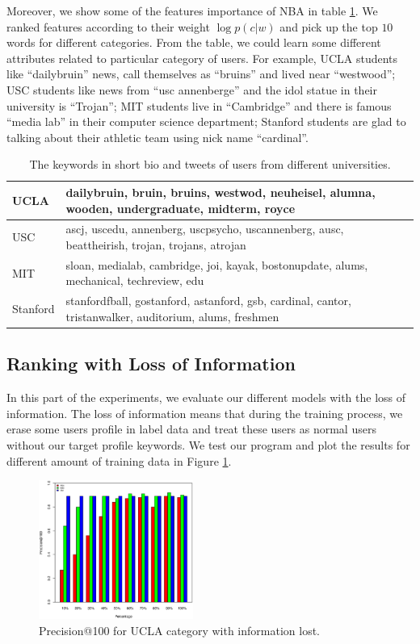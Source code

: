\documentclass{article}
\begin{document}
Moreover, we show some of the features importance of NBA in table \ref{tab:keyword}. We ranked features according to their weight $\log p(c|w)$ and pick up the top $10$ words for different categories. From the table, we could learn some different attributes related to particular category of users. For example, UCLA students like ``dailybruin'' news, call themselves as ``bruins'' and lived near ``westwood''; USC students like news from ``usc annenberge'' and the idol statue in their university is ``Trojan''; MIT students live in ``Cambridge'' and there is famous ``media lab'' in their computer science department; Stanford students are glad to talking about their athletic team using nick name ``cardinal''.

\begin{table}[h]
\centering
\begin{tabular}{|l|l|}
\hline
UCLA & dailybruin, bruin, bruins, westwod, neuheisel, alumna, wooden, undergraduate, midterm, royce \\
\hline
USC & ascj, uscedu, annenberg, uscpsycho, uscannenberg, ausc, beattheirish, trojan, trojans, atrojan \\
\hline
MIT & sloan, medialab, cambridge, joi, kayak, bostonupdate, alums, mechanical, techreview, edu \\
\hline
Stanford & stanfordfball, gostanford, astanford, gsb, cardinal, cantor, tristanwalker, auditorium, alums, freshmen \\
\hline
\end{tabular}
\caption{The keywords in short bio and tweets of users from different universities.}\label{tab:keyword}
\end{table}

\subsection{Ranking with Loss of Information}
In this part of the experiments, we evaluate our different models with the loss of information. The loss of information means that during the training process, we erase some users profile in label data and treat these users as normal users without our target profile keywords. We test our program and plot the results for different amount of training data in Figure \ref{fig:e3}.

\begin{figure}[h]
\centering
\includegraphics[width=0.45\textwidth]{experiment/e2.ucla.eps}
\caption{Precision@100 for UCLA category with information lost.}
\label{fig:e3}
\end{figure}
\end{document}
